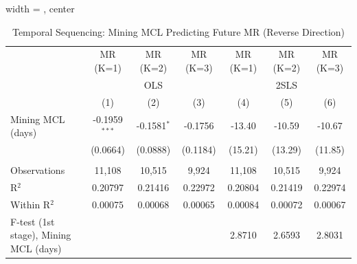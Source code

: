 
\begin{table}[htbp]
   
   \caption{\label{tab:strategic_lead_lag_reverse} Temporal Sequencing: Mining MCL Predicting Future MR (Reverse Direction)}
   \bigskip
   
   \centering
   
   \begin{adjustbox}{width = \textwidth, center}
      
      
      \begin{tabular}{lcccccc}
         \toprule
         
                                               & MR (K=1)        & MR (K=2)      & MR (K=3)      & MR (K=1)      & MR (K=2)      & MR (K=3)\\  
         
          & \multicolumn{3}{c}{OLS} & \multicolumn{3}{c}{2SLS} \\ 
         
                                               & (1)             & (2)           & (3)           & (4)           & (5)           & (6)\\  
         
         \midrule 
         Mining MCL (days)                     & -0.1959$^{***}$ & -0.1581$^{*}$ & -0.1756       & -13.40        & -10.59        & -10.67\\   
                                               & (0.0664)        & (0.0888)      & (0.1184)      & (15.21)       & (13.29)       & (11.85)\\   
         
          \\
         
         Observations                          & 11,108          & 10,515        & 9,924         & 11,108        & 10,515        & 9,924\\  
         R$^2$                                 & 0.20797         & 0.21416       & 0.22972       & 0.20804       & 0.21419       & 0.22974\\  
         Within R$^2$                          & 0.00075         & 0.00068       & 0.00065       & 0.00084       & 0.00072       & 0.00067\\  
         F-test (1st stage), Mining MCL (days) &                 &               &               & 2.8710        & 2.6593        & 2.8031\\  
         

\end{tabular}
\end{adjustbox}
\end{table}
